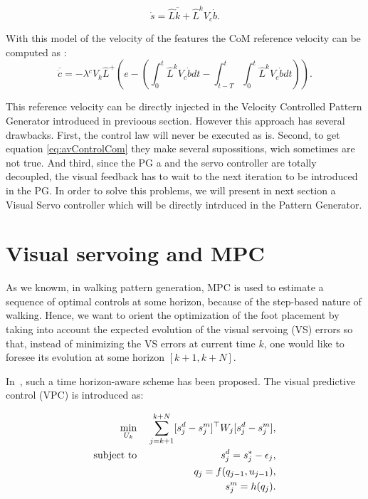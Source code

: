 \begin{equation}
\dot{s}={\widehat{L}}\overline{\dot{k}}+{\widehat{L}} ^{k}V_{c}{\dot{b}}.
\end{equation}

With this model of the velocity of the features the CoM reference velocity can be computed as :
\begin{equation} 
\overline{\dot{c}}= -\lambda{ ^{c}V_{k}{\widehat{L}}^{+}}(e -  (\int_{0}^{t}{\widehat{L}} ^{k}V_{c}\dot{b}dt -\int_{t-T}^t\int_0^t{\widehat{L}} ^{k}V_{c}\dot{b}dt)).
\label{eq:avControlCom} 
\end{equation} 

This reference velocity can be directly injected in the Velocity Controlled Pattern Generator introduced in previoous section. However this approach has several drawbacks. First, the control law will never be executed as is. Second, to get equation \ref{eq:avControlCom} they make several supossitions, wich sometimes are not true. And third, since the PG a and the servo controller are totally decoupled, the visual feedback has to wait to the next iteration to be introduced in the PG. In order to solve this problems, we will present in next section a Visual Servo controller which will be directly intrduced in the Pattern Generator.

\section{Visual servoing and MPC}
\label{sec:vsmauricio}

As we knowm, in walking pattern generation, MPC is used to estimate a sequence of optimal controls at some horizon, because of the step-based nature of walking. Hence, we want to orient the optimization of the foot placement by taking into account the expected evolution of the visual servoing (VS) errors so that, instead of minimizing the VS errors at current time $k$, one would like to foresee its evolution at some horizon $[k+1,k+N]$. 

In~\citep{Allibert2010}, such a time horizon-aware scheme has been proposed. The visual predictive control (VPC) is introduced as:

\begin{eqnarray}
\label{Eq:MinVisualFeatures}
 \min_{U_{k}} \;&& \sum\limits_{j=k+1}^{k+N} [s^d_j - s^m_j]^{\top} W_j [s^d_j - s^m_j], \\
 \mbox{subject to} \; && s^d_j = s^{*}_j - \epsilon_j, \\
 \label{Eq:ConstraintDynamicModel}
 && q_j = f(q_{j-1},u_{j-1}), \\
 \label{Eq:ConstraintProjection}
 && s^m_j = h(q_j).
\end{eqnarray}

